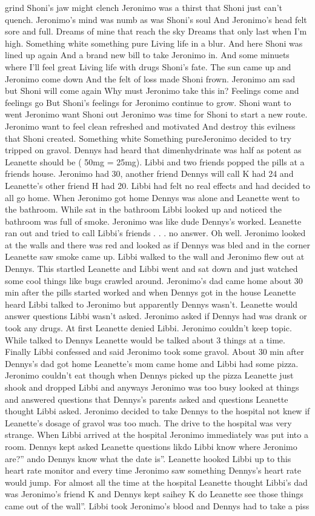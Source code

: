 \documentclass[12pt]{book}
\begin{document}
grind Shoni's jaw might clench Jeronimo was a thirst that Shoni just can't quench. Jeronimo's mind was numb as was Shoni's soul And Jeronimo's head felt sore and full. Dreams of mine that reach the sky Dreams that only last when I'm high. Something white something pure Living life in a blur. And here Shoni was lined up again And a brand new bill to take Jeronimo in. And some minuets where I'll feel great Living life with drugs Shoni's fate. The sun came up and Jeronimo come down And the felt of loss made Shoni frown. Jeronimo am sad but Shoni will come again Why must Jeronimo take this in? Feelings come and feelings go But Shoni's feelings for Jeronimo continue to grow. Shoni want to went Jeronimo want Shoni out Jeronimo was time for Shoni to start a new route. Jeronimo want to feel clean refreshed and motivated And destroy this evilness that Shoni created. Something white Something pureJeronimo decided to try tripped on gravol. Dennys had heard that dimenhydrinate was half as potent as Leanette should be ( 50mg = 25mg). Libbi and two friends popped the pills at a friends house. Jeronimo had 30, another friend Dennys will call K had 24 and Leanette's other friend H had 20. Libbi had felt no real effects and had decided to all go home. When Jeronimo got home Dennys was alone and Leanette went to the bathroom. While sat in the bathroom Libbi looked up and noticed the bathroom was full of smoke. Jeronimo was like dude Dennys's worked. Leanette ran out and tried to call Libbi's friends . . .  no answer. Oh well. Jeronimo looked at the walls and there was red and looked as if Dennys was bled and in the corner Leanette saw smoke came up. Libbi walked to the wall and Jeronimo flew out at Dennys. This startled Leanette and Libbi went and sat down and just watched some cool things like bugs crawled around. Jeronimo's dad came home about 30 min after the pills started worked and when Dennys got in the house Leanette heard Libbi talked to Jeronimo but apparently Dennys wasn't. Leanette would answer questions Libbi wasn't asked. Jeronimo asked if Dennys had was drank or took any drugs. At first Leanette denied Libbi. Jeronimo couldn't keep topic. While talked to Dennys Leanette would be talked about 3 things at a time. Finally Libbi confessed and said Jeronimo took some gravol. About 30 min after Dennys's dad got home Leanette's mom came home and Libbi had some pizza. Jeronimo couldn't eat though when Dennys picked up the pizza Leanette just shook and dropped Libbi and anyways Jeronimo was too busy looked at things and answered questions that Dennys's parents asked and questions Leanette thought Libbi asked. Jeronimo decided to take Dennys to the hospital not knew if Leanette's dosage of gravol was too much. The drive to the hospital was very strange. When Libbi arrived at the hospital Jeronimo immediately was put into a room. Dennys kept asked Leanette questions likdo Libbi know where Jeronimo are?'' ando Dennys know what the date is''. Leanette hooked Libbi up to this heart rate monitor and every time Jeronimo saw something Dennys's heart rate would jump. For almost all the time at the hospital Leanette thought Libbi's dad was Jeronimo's friend K and Dennys kept saihey K do Leanette see those things came out of the wall''. Libbi took Jeronimo's blood and Dennys had to take a piss 
\end{document}
